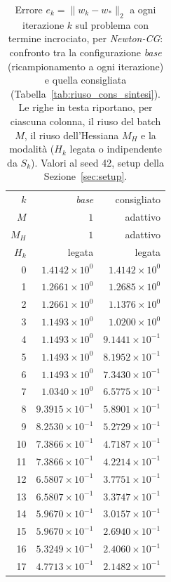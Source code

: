 \begin{table}[H]
\centering
\footnotesize
\renewcommand{\arraystretch}{0.85}
\setlength{\tabcolsep}{8pt}
\caption{Errore $e_k=\|w_k-w_*\|_2$ a ogni iterazione $k$ sul problema con termine incrociato, per \emph{Newton-CG}: confronto tra la configurazione \emph{base} (ricampionamento a ogni iterazione) e quella consigliata (Tabella~\ref{tab:riuso_cons_sintesi}). Le righe in testa riportano, per ciascuna colonna, il riuso del batch $M$, il riuso dell'Hessiana $M_H$ e la modalità ($H_k$ legata o indipendente da $S_k$). Valori al seed 42, setup della Sezione~\ref{sec:setup}.}
\label{tab:riuso_cons_offdiag_ncg}
\begin{tabular}{@{}rrr@{}}
\toprule
$k$ & \emph{base} & consigliato\\
$M$ & $1$ & adattivo\\
$M_H$ & $1$ & adattivo\\
$H_k$ & legata & legata\\
\midrule
0 & $1.4142\times10^{0}$ & $1.4142\times10^{0}$\\
1 & $1.2661\times10^{0}$ & $1.2685\times10^{0}$\\
2 & $1.2661\times10^{0}$ & $1.1376\times10^{0}$\\
3 & $1.1493\times10^{0}$ & $1.0200\times10^{0}$\\
4 & $1.1493\times10^{0}$ & $9.1441\times10^{-1}$\\
5 & $1.1493\times10^{0}$ & $8.1952\times10^{-1}$\\
6 & $1.1493\times10^{0}$ & $7.3430\times10^{-1}$\\
7 & $1.0340\times10^{0}$ & $6.5775\times10^{-1}$\\
8 & $9.3915\times10^{-1}$ & $5.8901\times10^{-1}$\\
9 & $8.2530\times10^{-1}$ & $5.2729\times10^{-1}$\\
10 & $7.3866\times10^{-1}$ & $4.7187\times10^{-1}$\\
11 & $7.3866\times10^{-1}$ & $4.2214\times10^{-1}$\\
12 & $6.5807\times10^{-1}$ & $3.7751\times10^{-1}$\\
13 & $6.5807\times10^{-1}$ & $3.3747\times10^{-1}$\\
14 & $5.9670\times10^{-1}$ & $3.0157\times10^{-1}$\\
15 & $5.9670\times10^{-1}$ & $2.6940\times10^{-1}$\\
16 & $5.3249\times10^{-1}$ & $2.4060\times10^{-1}$\\
17 & $4.7713\times10^{-1}$ & $2.1482\times10^{-1}$\\

\end{tabular}
\end{table}
